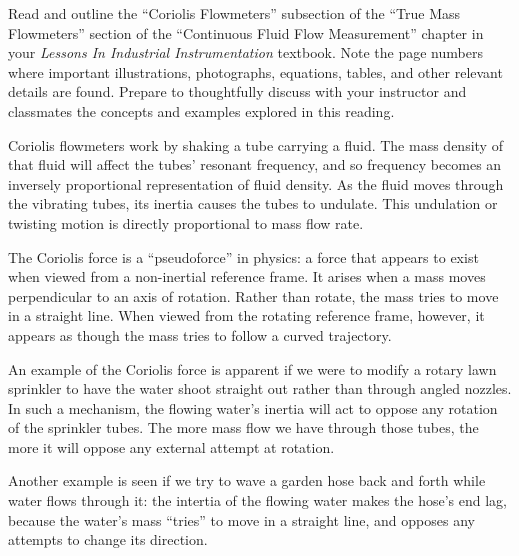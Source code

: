 

Read and outline the ``Coriolis Flowmeters'' subsection of the ``True Mass Flowmeters'' section of the ``Continuous Fluid Flow Measurement'' chapter in your {\it Lessons In Industrial Instrumentation} textbook.  Note the page numbers where important illustrations, photographs, equations, tables, and other relevant details are found.  Prepare to thoughtfully discuss with your instructor and classmates the concepts and examples explored in this reading.














Coriolis flowmeters work by shaking a tube carrying a fluid.  The mass density of that fluid will affect the tubes' resonant frequency, and so frequency becomes an inversely proportional representation of fluid density.  As the fluid moves through the vibrating tubes, its inertia causes the tubes to undulate.  This undulation or twisting motion is directly proportional to mass flow rate.

\vskip 10pt

The Coriolis force is a ``pseudoforce'' in physics: a force that appears to exist when viewed from a non-inertial reference frame.  It arises when a mass moves perpendicular to an axis of rotation.  Rather than rotate, the mass tries to move in a straight line.  When viewed from the rotating reference frame, however, it appears as though the mass tries to follow a curved trajectory.

\vskip 10pt

An example of the Coriolis force is apparent if we were to modify a rotary lawn sprinkler to have the water shoot straight out rather than through angled nozzles.  In such a mechanism, the flowing water's inertia will act to oppose any rotation of the sprinkler tubes.  The more mass flow we have through those tubes, the more it will oppose any external attempt at rotation.

Another example is seen if we try to wave a garden hose back and forth while water flows through it: the intertia of the flowing water makes the hose's end lag, because the water's mass ``tries'' to move in a straight line, and opposes any attempts to change its direction.

